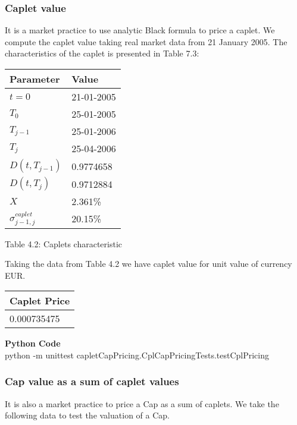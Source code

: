 \documentclass[11pt]{article}
\numberwithin{equation}{subsection}
\begin{document}
\subsubsection{Caplet value}
It is a market practice to use analytic Black formula to price a caplet. We compute the caplet value taking real market data from 21 January 2005. The characteristics of the caplet is presented in Table 7.3:

\vskip 0.2cm 		
{
\begin{center}
		\begin{tabular}{ll}
		\hline
		Parameter          & Value \\
		\hline
		\(t=0\)            &  21-01-2005 \\
		\(T_0\)            &  25-01-2005 \\
		\(T_{j−1}\)        & 25-01-2006 \\
		\(T_j\)            &  25-04-2006 \\
		\(D(t, T_{j-1})\)  &  0.9774658 \\
		\(D(t, T_{j})\)    &  0.9712884 \\
		\(X\)  			   & 2.361\%  \\
		\(\sigma^{caplet}_{j-1, j}\) & 20.15\% \\
		\hline				 				
	\end{tabular}
	\begin{center}
		Table 4.2: Caplets characteristic
	\end{center}
\end{center}
}
\vskip 0.4cm

Taking the data from Table 4.2 we have caplet value for unit value of currency EUR.

\vskip 0.2cm 		
{
	\begin{center}
		\begin{tabular}{l}
			\hline
			Caplet Price \\
			\hline
			0.000735475 \\
			\hline
		\end{tabular}
	\end{center}
}
\vskip 0.4cm

\textbf{Python Code}\\
python -m unittest capletCapPricing.CplCapPricingTests.testCplPricing
\subsubsection{Cap value as a sum of caplet values}
It is also a market practice to price a Cap as a sum of caplets. We take the following data to test the valuation of a Cap.
\end{document}
